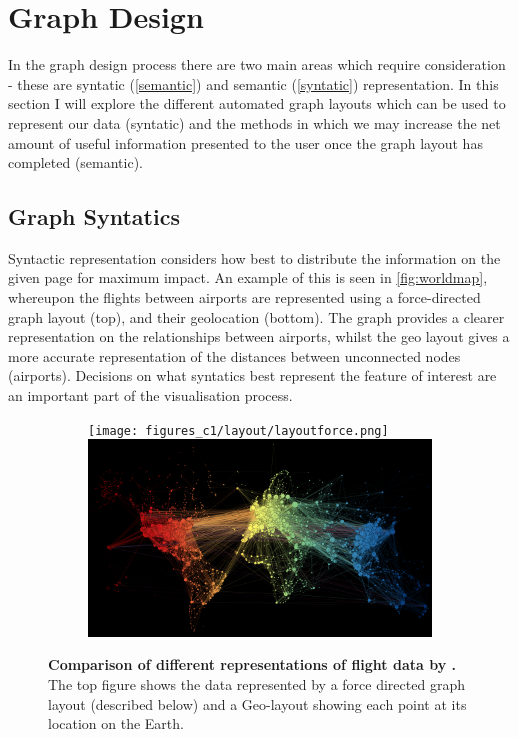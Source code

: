 \section{Graph Design}
In the graph design process there are two main areas which require consideration - these are syntatic (\autoref{semantic}) and semantic (\autoref{syntatic}) representation. In this section I will explore the different automated graph layouts which can be used to represent our data (syntatic) and the methods in which we may increase the net amount of useful information presented to the user once the graph layout has completed (semantic). 



\subsection{Graph Syntatics}\label{syntatic}

 Syntactic representation considers how best to distribute the information on the given page for maximum impact. An example of this is seen in \autoref{fig:worldmap}, whereupon the flights between airports are represented using a force-directed graph layout (top), and their geolocation (bottom). 
 The graph provides a clearer representation on the relationships between airports, whilst the geo layout gives a more accurate representation of the distances between unconnected nodes (airports). Decisions on what syntatics best represent the feature of interest are an important part of the visualisation process. 
 
\begin{figure}[H]
     \centering 
      \begin{subfigure}[b,black]{.9\textwidth}
         \centering 
     \texttt{[image: figures\_c1/layout/layoutforce.png]}
     \includegraphics[width=\textwidth]{figures_c1/layout/layoutgeo.png}
     \end{subfigure}
        \caption{\textbf{Comparison of different representations of flight data by \cite{worldmap}.} The top figure shows the data represented by a force directed graph layout (described below) and a Geo-layout showing each point at its location on the Earth.}
        \label{fig:worldmap}
\end{figure}


